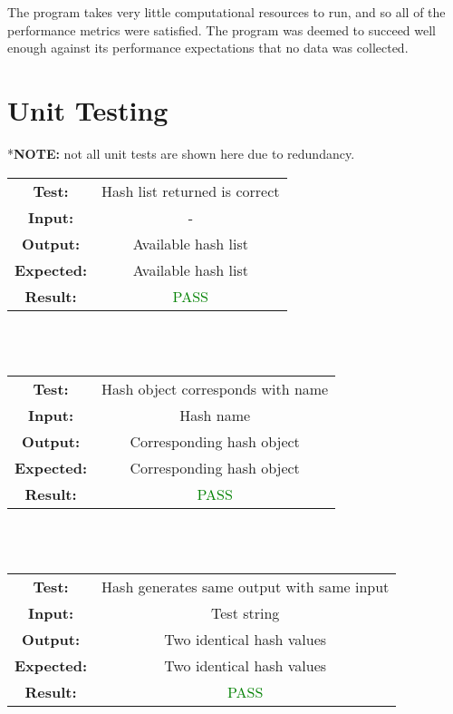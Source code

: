 \documentclass[12pt, titlepage]{article}
\begin{document}
The program takes very little computational resources to run, and so all of the performance metrics were satisfied. The program was deemed to succeed well enough against its performance expectations that no data was collected.

\section{Unit Testing}

*\textbf{NOTE:} not all unit tests are shown here due to redundancy. \\

\begin{tabular}{|cc|}
    \hline
    \textbf{Test:} & Hash list returned is correct \\
    \textbf{Input:} & - \\
    \textbf{Output:} & Available hash list \\
    \textbf{Expected:} & Available hash list \\
    \textbf{Result:} & \textcolor{Green}{PASS} \\
    \hline
\end{tabular} \\ \\

\begin{tabular}{|cc|}
    \hline
    \textbf{Test:} & Hash object corresponds with name \\
    \textbf{Input:} & Hash name \\
    \textbf{Output:} & Corresponding hash object \\
    \textbf{Expected:} & Corresponding hash object \\
    \textbf{Result:} & \textcolor{Green}{PASS} \\
    \hline
\end{tabular} \\ \\

\begin{tabular}{|cc|}
    \hline
    \textbf{Test:} & Hash generates same output with same input \\
    \textbf{Input:} & Test string \\
    \textbf{Output:} & Two identical hash values \\
    \textbf{Expected:} & Two identical hash values \\
    \textbf{Result:} & \textcolor{Green}{PASS} \\
    \hline
\end{tabular} \\ \\
\end{document}
